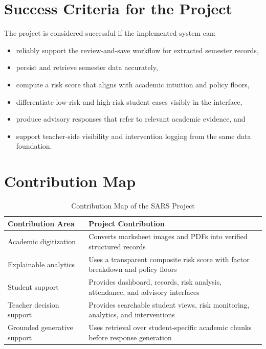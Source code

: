 \section{Success Criteria for the Project}
The project is considered successful if the implemented system can:
\begin{itemize}[leftmargin=*]
\item reliably support the review-and-save workflow for extracted semester records,
\item persist and retrieve semester data accurately,
\item compute a risk score that aligns with academic intuition and policy floors,
\item differentiate low-risk and high-risk student cases visibly in the interface,
\item produce advisory responses that refer to relevant academic evidence, and
\item support teacher-side visibility and intervention logging from the same data foundation.
\end{itemize}

\section{Contribution Map}
\begin{table}[H]
\centering
\caption{Contribution Map of the SARS Project}
\begin{tabularx}{\textwidth}{>{\raggedright\arraybackslash}p{} >{\raggedright\arraybackslash}X}
\toprule
\textbf{Contribution Area} & \textbf{Project Contribution} \\
\midrule
Academic digitization & Converts marksheet images and PDFs into verified structured records \\
Explainable analytics & Uses a transparent composite risk score with factor breakdown and policy floors \\
Student support & Provides dashboard, records, risk analysis, attendance, and advisory interfaces \\
Teacher decision support & Provides searchable student views, risk monitoring, analytics, and interventions \\
Grounded generative support & Uses retrieval over student-specific academic chunks before response generation \\
\bottomrule
\end{tabularx}
\end{table}

